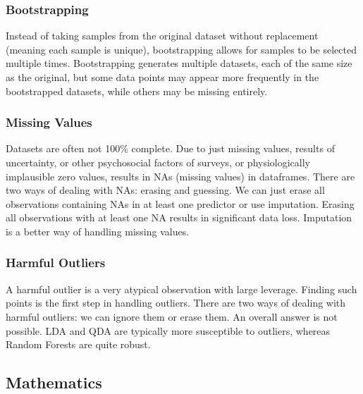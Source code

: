\documentclass[12pt,a4paper,titlepage]{article}
\numberwithin{equation}{section}
\numberwithin{table}{section}
\numberwithin{figure}{section}
\begin{document}
        \subsubsection{Bootstrapping}\label{app:bootstrapping}
        Instead of taking samples from the original dataset without replacement (meaning each sample is unique), bootstrapping allows for samples to be selected multiple times. Bootstrapping generates multiple datasets, each of the same size as the original, but some data points may appear more frequently in the bootstrapped datasets, while others may be missing entirely.
        \subsubsection{Missing Values}\label{Missing values}
        Datasets are often not 100\% complete. Due to just missing values, results of uncertainty, or other psychosocial factors of surveys, or physiologically implausible zero values, results in NAs (missing values) in dataframes. There are two ways of dealing with NAs: erasing and guessing. We can just erase all observations containing NAs in at least one predictor or use imputation. Erasing all observations with at least one NA results in significant data loss. Imputation is a better way of handling missing values.
        \subsubsection{Harmful Outliers}\label{Harmful Outliers}
        A harmful outlier is a very atypical observation with large leverage. Finding such points is the first step in handling outliers. There are two ways of dealing with harmful outliers: we can ignore them or erase them. An overall answer is not possible. LDA and QDA are typically more susceptible to outliers, whereas Random Forests are quite robust.
        
    \subsection{Mathematics}
\end{document}
